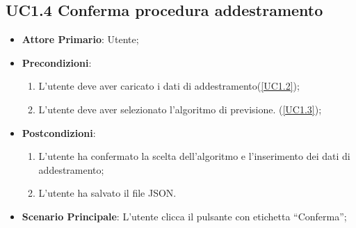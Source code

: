 	\subsection{UC1.4 Conferma procedura addestramento}
		\begin{itemize}
			\item\textbf{Attore Primario}: Utente;
			\item\textbf{Precondizioni}:
				\begin{enumerate}
					\item L’utente deve aver caricato i dati di addestramento(\ref{UC1.2});
					\item  L’utente deve aver selezionato l’algoritmo di previsione. (\ref{UC1.3}); 
				\end{enumerate}
			\item\textbf{Postcondizioni}:
				\begin{enumerate}
					\item L’utente ha confermato la scelta dell’algoritmo e l’inserimento dei dati di addestramento;
					\item L’utente ha salvato il file JSON.
				\end{enumerate}
			\item\textbf{Scenario Principale}: L’utente clicca il pulsante con etichetta “Conferma”;
		\end{itemize}



